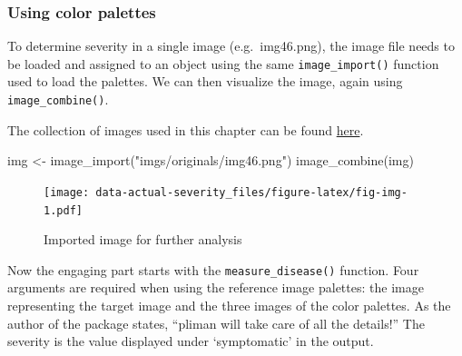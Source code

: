 \documentclass[
  letterpaper,
]{book}
\newenvironment{Shaded}{\begin{snugshade}}{\end{snugshade}}
\newcommand{\FunctionTok}[1]{\textcolor[rgb]{0.28,0.35,0.67}{#1}}
\newcommand{\NormalTok}[1]{\textcolor[rgb]{0.00,0.23,0.31}{#1}}
\newcommand{\OtherTok}[1]{\textcolor[rgb]{0.00,0.23,0.31}{#1}}
\newcommand{\StringTok}[1]{\textcolor[rgb]{0.13,0.47,0.30}{#1}}
\begin{document}
\hypertarget{using-color-palettes}{%
\subsubsection{Using color palettes}\label{using-color-palettes}}

To determine severity in a single image (e.g.~img46.png), the image file
needs to be loaded and assigned to an object using the same
\texttt{image\_import()} function used to load the palettes. We can then
visualize the image, again using \texttt{image\_combine()}.

\begin{tcolorbox}[enhanced jigsaw, coltitle=black, colbacktitle=quarto-callout-tip-color!10!white, colframe=quarto-callout-tip-color-frame, title=\textcolor{quarto-callout-tip-color}{\faLightbulb}\hspace{0.5em}{Tip}, arc=.35mm, bottomrule=.15mm, breakable, opacitybacktitle=0.6, toptitle=1mm, titlerule=0mm, bottomtitle=1mm, rightrule=.15mm, opacityback=0, leftrule=.75mm, colback=white, toprule=.15mm, left=2mm]

The collection of images used in this chapter can be found
\href{https://github.com/emdelponte/epidemiology-R/tree/main/imgs/originals}{here}.

\end{tcolorbox}

\begin{Shaded}
\begin{Highlighting}[]
\NormalTok{img }\OtherTok{\textless{}{-}} \FunctionTok{image\_import}\NormalTok{(}\StringTok{"imgs/originals/img46.png"}\NormalTok{)}
\FunctionTok{image\_combine}\NormalTok{(img)}
\end{Highlighting}
\end{Shaded}

\begin{figure}

{\centering \texttt{[image: data-actual-severity\_files/figure-latex/fig-img-1.pdf]}

}

\caption{\label{fig-img}Imported image for further analysis}

\end{figure}

Now the engaging part starts with the \texttt{measure\_disease()}
function. Four arguments are required when using the reference image
palettes: the image representing the target image and the three images
of the color palettes. As the author of the package states, ``pliman
will take care of all the details!'' The severity is the value displayed
under `symptomatic' in the output.
\end{document}
